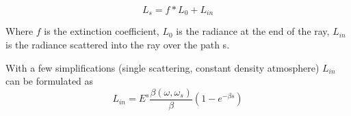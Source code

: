 \documentclass[12pt,a4paper]{scrartcl}
\begin{document}
\begin{equation}
L_s = f * L_0 + L_{in}
\end{equation}

Where $f$ is the extinction coefficient, $L_0$ is the radiance at the end of the ray, $L_{in}$ is the radiance scattered into the ray over the path s.

With a few simplifications (single scattering, constant density atmosphere) $L_{in}$ can be formulated as 
\begin{equation}
L_{in} = E^s \frac{\beta(\omega, \omega_s)}{\beta} (1 - e^{-\beta s})
\end{equation}










\end{document}
